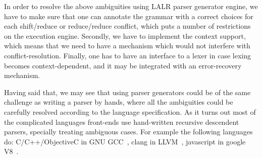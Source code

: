 In order to resolve the above ambiguities using LALR parser generator
engine, we have to make sure that one can annotate the grammar with a correct
choices for each shift/reduce or reduce/reduce conflict, which puts
a number of restrictions on the execution engine.  Secondly, we have
to implement the context support, which means that we need to have a
mechanism which would not interfere with conflict-resolution.
Finally, one has to have an interface to a lexer in case lexing becomes
context-dependent, and it may be integrated with an error-recovery
mechanism.

Having said that, we may see that using parser generators could be of
the same challenge as writing a parser by hands, where all the
ambiguities could be carefully resolved according to the language
specification.  As it turns out most of the complicated languages
front-ends use hand-written recursive descendent parsers, specially
treating ambiguous cases.  For example the following languages do:
C/C++/ObjectiveC in GNU GCC~\cite{gcc}, clang in LLVM~\cite{}, 
javascript in google V8~\cite{}.


